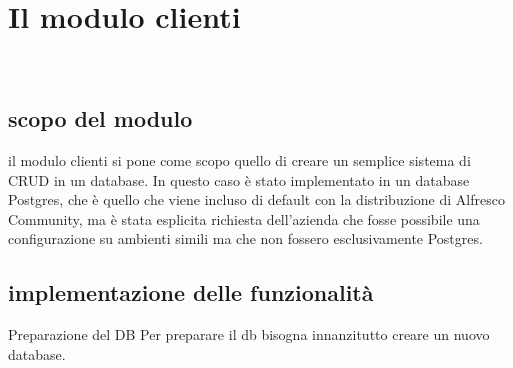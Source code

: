 %
%
%
%
%
%
%
%
%
%
%
%
%
\chapter{Il modulo clienti}
\label{cap:modulo-clienti}

\\

\section{scopo del modulo} il modulo clienti si pone come scopo quello di creare un semplice sistema di CRUD in un database. In questo caso è stato implementato in un database Postgres, che è quello che viene incluso di default con la distribuzione di Alfresco Community, ma è stata esplicita richiesta dell'azienda che fosse possibile una configurazione su ambienti simili ma che non fossero esclusivamente Postgres.
\section{implementazione delle funzionalità}
Preparazione del DB
Per preparare il db bisogna innanzitutto creare un nuovo database.

